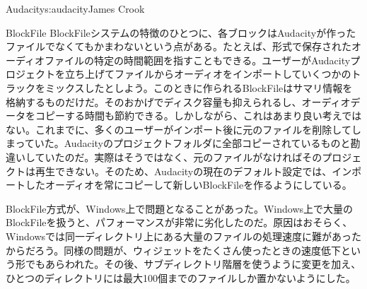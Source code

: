 \begin{aosachapter}{Audacity}{s:audacity}{James Crook}
\begin{aosasect1}{BlockFile}
BlockFileシステムの特徴のひとつに、各ブロックはAudacityが作ったファイルでなくてもかまわないという点がある。たとえば、形式で保存されたオーディオファイルの特定の時間範囲を指すこともできる。ユーザーがAudacityプロジェクトを立ち上げてファイルからオーディオをインポートしていくつかのトラックをミックスしたとしよう。このときに作られるBlockFileはサマリ情報を格納するものだけだ。そのおかげでディスク容量も抑えられるし、オーディオデータをコピーする時間も節約できる。しかしながら、これはあまり良い考えではない。これまでに、多くのユーザーがインポート後に元のファイルを削除してしまっていた。Audacityのプロジェクトフォルダに全部コピーされているものと勘違いしていたのだ。実際はそうではなく、元のファイルがなければそのプロジェクトは再生できない。そのため、Audacityの現在のデフォルト設定では、インポートしたオーディオを常にコピーして新しいBlockFileを作るようにしている。

BlockFile方式が、Windows上で問題となることがあった。Windows上で大量のBlockFileを扱うと、パフォーマンスが非常に劣化したのだ。原因はおそらく、Windowsでは同一ディレクトリ上にある大量のファイルの処理速度に難があったからだろう。同様の問題が、ウィジェットをたくさん使ったときの速度低下という形でもあらわれた。その後、サブディレクトリ階層を使うように変更を加え、ひとつのディレクトリには最大100個までのファイルしか置かないようにした。


\end{aosasect1}
\end{aosachapter}
